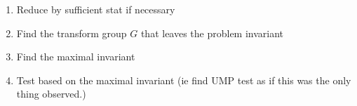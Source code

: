 \documentclass{article}
\begin{document}
\begin{recipe}
\begin{enumerate}
	\item Reduce by sufficient stat if necessary
	\item Find the transform group $G$ that leaves the problem invariant 
	\item Find the maximal invariant
	\item Test based on the maximal invariant (ie find UMP test as if this was the only thing observed.)
\end{enumerate}	
\end{recipe}



\end{document}
